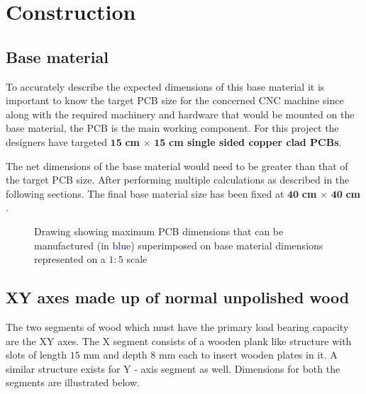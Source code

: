 \chapter{Construction} \label{chapter3}

\section{Base material} \label{bmaterial}

To accurately describe the expected dimensions of this base material it is important to know the target PCB size for the concerned CNC machine since along with the required machinery and hardware that would be mounted on the base material, the PCB is the main working component. For this project the designers have targeted $\boldsymbol{15}$ \textbf{cm} $\boldsymbol{\times}$ $\boldsymbol{15}$ \textbf{cm single sided copper clad PCBs}. \par

The net dimensions of the base material would need to be greater than that of the target PCB size. After performing multiple calculations as described in the following sections. The final base material size has been fixed at $\boldsymbol{40}$ \textbf{cm} $\boldsymbol{\times}$ $\boldsymbol{40}$ \textbf{cm} .

\begin{figure}[h]
 \centering
 \caption{Drawing showing maximum PCB dimensions that can be manufactured (in \textcolor{blue}{blue}) superimposed on base material dimensions represented on a $1:5$ scale}
 \label{fig:base}
\end{figure}


\section{XY axes made up of normal unpolished wood}

The two segments of wood which must have the primary load bearing capacity are the XY axes. The X segment consists of a wooden plank like structure with slots of length $15$ mm and depth $8$ mm each to insert wooden plates in it. A similar structure exists for Y - axis segment as well. Dimensions for both the segments are illustrated below. \par


